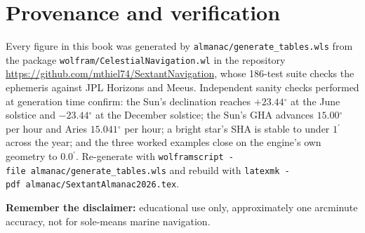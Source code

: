 \documentclass[10pt,letterpaper,twoside]{book}
\newcommand{\dg}{\ensuremath{{}^{\circ}}}
\newcommand{\pr}{\ensuremath{{}^{\prime}}}
\begin{document}
\chapter{Provenance and verification}
\sloppy
Every figure in this book was generated by
\texttt{almanac/}\allowbreak\texttt{generate\_tables.wls}
from the package \texttt{wolfram/}\allowbreak\texttt{CelestialNavigation.wl} in the repository
\url{https://github.com/mthiel74/SextantNavigation}, whose 186-test suite checks
the ephemeris against JPL Horizons and Meeus. Independent sanity checks performed
at generation time confirm: the Sun's declination reaches $+23.44\dg$ at the June
solstice and $-23.44\dg$ at the December solstice; the Sun's GHA advances
$15.00\dg$ per hour and Aries $15.041\dg$ per hour; a bright star's SHA is stable
to under $1\pr$ across the year; and the three worked examples close on the
engine's own geometry to $0.0\pr$. Re-generate with
\texttt{wolframscript -file}\allowbreak\ \texttt{almanac/}\allowbreak\texttt{generate\_tables.wls}
and rebuild with
\texttt{latexmk -pdf}\allowbreak\ \texttt{almanac/}\allowbreak\texttt{SextantAlmanac2026.tex}.

\medskip
\noindent\textbf{Remember the disclaimer:} educational use only, approximately one
arcminute accuracy, not for sole-means marine navigation.
\end{document}
